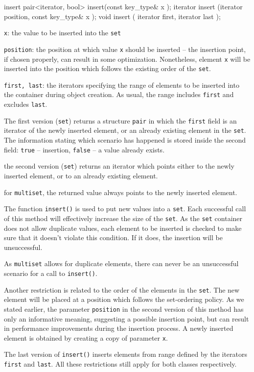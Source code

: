 \begin{methodinfo}
  {insert}
  {pair<iterator, bool> insert(const key_type& x );
  iterator insert (iterator position, const key_type& x );
  void insert ( iterator first, iterator last );}
  {\texttt{x}: the value to be inserted into the \texttt{set}

  \texttt{position}: the position at which value \texttt{x} should be inserted – the insertion point, 
  if chosen properly, can result in some optimization. Nonetheless, element \texttt{x} will be 
  inserted into the position which follows the existing order of the \texttt{set}.

  \texttt{first, last}: the iterators specifying the range of elements to be inserted into 
  the container during object creation. As usual, the range includes \texttt{first} and excludes \texttt{last}.}
  {The first version (\texttt{set}) returns a structure \texttt{pair} in which the \texttt{first} field is 
  an iterator of the newly inserted element, or an already existing element in the \texttt{set}. 
  The information stating which scenario has happened is stored inside the second field: \texttt{true} – 
  insertion, \texttt{false} – a value already exists.

  the second version (\texttt{set}) returns an iterator which points either to the newly inserted element, 
  or to an already existing element.

  for \texttt{multiset}, the returned value always points to the newly inserted element.}
  {The function \texttt{insert()} is used to put new values into a \texttt{set}. 
  Each successful call of this method will effectively increase the size of the \texttt{set}. 
  As the \texttt{set} container does not allow duplicate values, each element to be inserted is 
  checked to make sure that it doesn’t violate this condition. If it does, the insertion will be unsuccessful.

  As \texttt{multiset} allows for duplicate elements, there can never be an unsuccessful scenario for 
  a call to \texttt{insert()}.

  Another restriction is related to the order of the elements in the \texttt{set}. 
  The new element will be placed at a position which follows the set-ordering policy. 
  As we stated earlier, the parameter \texttt{position} in the second version of this method 
  has only an informative meaning, suggesting a possible insertion point, but can result in 
  performance improvements during the insertion process. A newly inserted element is obtained by 
  creating a copy of parameter \texttt{x}.
  
  The last version of \texttt{insert()} inserts elements from range defined by the iterators 
  \texttt{first} and \texttt{last}. All these restrictions still apply for both classes respectively.}
\end{methodinfo}

